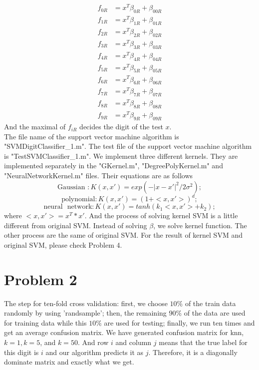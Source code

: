 \documentclass[11pt]{article}
\begin{document}
\begin{equation}
\begin{aligned}
f_{0R} &= x^T\beta_{0R}+\beta_{00R}\\
f_{1R} &= x^T\beta_{1R}+\beta_{01R}\\
f_{2R} &= x^T\beta_{2R}+\beta_{02R}\\
f_{3R} &= x^T\beta_{3R}+\beta_{03R}\\
f_{4R} &= x^T\beta_{4R}+\beta_{04R}\\
f_{5R} &= x^T\beta_{5R}+\beta_{05R}\\
f_{6R} &= x^T\beta_{6R}+\beta_{06R}\\
f_{7R} &= x^T\beta_{7R}+\beta_{07R}\\
f_{8R} &= x^T\beta_{8R}+\beta_{08R}\\
f_{9R} &= x^T\beta_{9R}+\beta_{09R}
\end{aligned}
\end{equation}
And the maximal of $f_{iR}$ decides the digit of the test $x$.\\
The file name of the support vector machine algorithm is "SVMDigitClassifier\_1.m". The test file of  the support vector machine algorithm is "TestSVMClassifier\_1.m". We implement three different kernels. They are implemented separately in the "GKernel.m", "DegreePolyKernel.m" and "NeuralNetworkKernel.m" files. Their equations are as follows\\
\begin{equation}
\textrm{Gaussian }: K(x, x') = exp(-|x - x'|^2/2\sigma^2);
\end{equation}
\begin{equation}
\textrm{polynomial} : K(x, x') = (1 + <x, x'>)^d;
\end{equation}
\begin{equation}
\textrm{neural ~network} : K(x, x') = tanh (k_1<x, x'> + k_2);
\end{equation}
where $<x,x'> = x^T*x'$.
And the process of solving kernel SVM  is a little different from original SVM. Instead of solving $\beta$, we solve kernel function. The other process are the same of original SVM. For the result of kernel SVM and original SVM, please check Problem 4.
\section{Problem 2}
The step for ten-fold cross validation: first, we choose $10\%$ of the train data randomly by using 'randsample'; then, the remaining $90\%$ of the data are used for training data while this $10\%$ are used for testing; finally, we run ten times and get an average confusion matrix. We have generated confusion matrix for knn, $k = 1, k = 5$, and $k= 50$.  And row $i$ and column $j$ means that the true label for this digit is $i$ and our algorithm predicts it as $j$. Therefore, it is a diagonally dominate matrix and exactly what we get. \\
\end{document}
